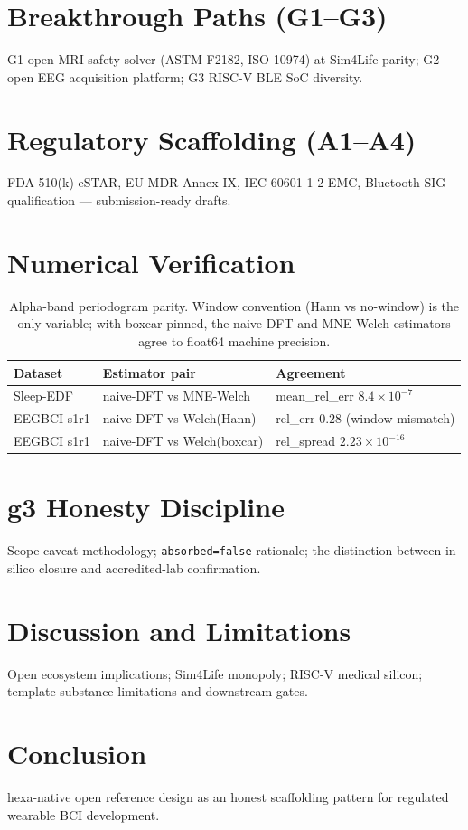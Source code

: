 \documentclass[11pt]{article}
\begin{document}
\section{Breakthrough Paths (G1--G3)}
G1 open MRI-safety solver (ASTM F2182, ISO 10974) at Sim4Life parity;
G2 open EEG acquisition platform; G3 RISC-V BLE SoC diversity.

\section{Regulatory Scaffolding (A1--A4)}
FDA 510(k) eSTAR, EU MDR Annex IX, IEC 60601-1-2 EMC, Bluetooth SIG
qualification --- submission-ready drafts.

\section{Numerical Verification}
\begin{table}[h]
\centering
\begin{tabular}{lll}
\toprule
Dataset & Estimator pair & Agreement \\
\midrule
Sleep-EDF & naive-DFT vs MNE-Welch & mean\_rel\_err $8.4\times10^{-7}$ \\
EEGBCI s1r1 & naive-DFT vs Welch(Hann) & rel\_err $0.28$ (window mismatch) \\
EEGBCI s1r1 & naive-DFT vs Welch(boxcar) & rel\_spread $2.23\times10^{-16}$ \\
\bottomrule
\end{tabular}
\caption{Alpha-band periodogram parity. Window convention (Hann vs
no-window) is the only variable; with boxcar pinned, the naive-DFT and
MNE-Welch estimators agree to float64 machine precision.}
\end{table}

\section{g3 Honesty Discipline}
Scope-caveat methodology; \texttt{absorbed=false} rationale; the
distinction between in-silico closure and accredited-lab confirmation.

\section{Discussion and Limitations}
Open ecosystem implications; Sim4Life monopoly; RISC-V medical
silicon; template-substance limitations and downstream gates.

\section{Conclusion}
hexa-native open reference design as an honest scaffolding pattern for
regulated wearable BCI development.
\end{document}
